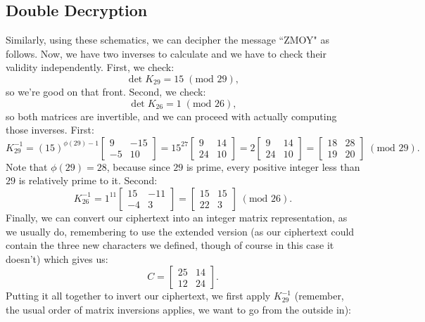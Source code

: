 \documentclass{article}
\begin{document}
\subsection{Double Decryption}
Similarly, using these schematics, we can decipher the message ``ZMOY" as follows. Now, we have two inverses to calculate and we have to check their validity independently. First, we check:
\[
    \det K_{29} = 15 \; (\text{mod } 29),
\]
so we're good on that front. Second, we check:
\[
    \det K_{26} = 1 \; (\text{mod } 26),
\]
so both matrices are invertible, and we can proceed with actually computing those inverses. First:
\[
    K_{29}^{-1} = (15)^{\phi(29) - 1} \begin{bmatrix}
        9 & -15 \\
        -5 & 10
    \end{bmatrix} = 15^{27} \begin{bmatrix}
        9 & 14 \\
        24 & 10
    \end{bmatrix} = 2 \begin{bmatrix}
        9 & 14 \\
        24 & 10
    \end{bmatrix} = \begin{bmatrix}
        18 & 28 \\
        19 & 20
    \end{bmatrix} \; (\text{mod } 29).
\]
Note that $\phi(29) = 28$, because since $29$ is prime, every positive integer less than $29$ is relatively prime to it. Second:
\[
    K_{26}^{-1} = 1^{11} \begin{bmatrix}
        15 & -11 \\
        -4 & 3
    \end{bmatrix} = \begin{bmatrix}
        15 & 15 \\
        22 & 3
    \end{bmatrix} \; (\text{mod } 26).
\]
Finally, we can convert our ciphertext into an integer matrix representation, as we usually do, remembering to use the extended version (as our ciphertext could contain the three new characters we defined, though of course in this case it doesn't) which gives us:
\[
    C = \begin{bmatrix}
        25 & 14 \\
        12 & 24
    \end{bmatrix}.
\]
Putting it all together to invert our ciphertext, we first apply $K_{29}^{-1}$ (remember, the usual order of matrix inversions applies, we want to go from the outside in):
\end{document}
